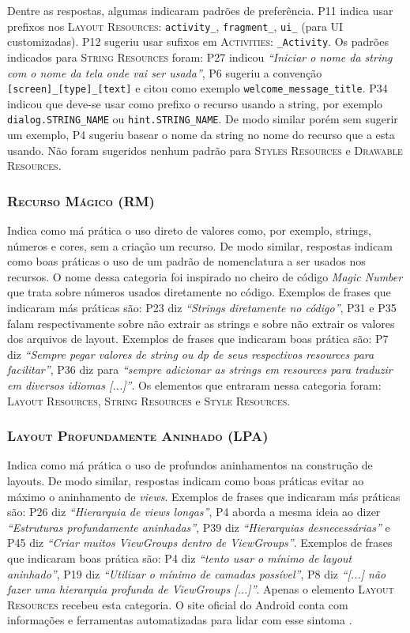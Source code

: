 Dentre as respostas, algumas indicaram padrões de preferência. P11 indica usar prefixos nos \textsc{Layout Resources}: \texttt{activity\_}, \texttt{fragment\_}, \texttt{ui\_} (para UI customizadas). P12 sugeriu usar sufixos em \textsc{Activities}: \texttt{\_Activity}. Os padrões indicados para \textsc{String Resources} foram: P27 indicou \textit{``Iniciar o nome da string com o nome da tela onde vai ser usada''}, P6 sugeriu a convenção \texttt{[screen]\_[type]\_[text]} e citou como exemplo \texttt{welcome\_message\_title}. P34 indicou que deve-se usar como prefixo o recurso usando a string, por exemplo \texttt{dialog.STRING\_NAME} ou \texttt{hint.STRING\_NAME}. De modo similar porém sem sugerir um exemplo, P4 sugeriu basear o nome da string no nome do recurso que a esta usando. Não foram sugeridos nenhum padrão para \textsc{Styles Resources} e \textsc{Drawable Resources}.

\subsubsection{\textsc{Recurso Mágico (RM)}}
Indica como má prática o uso direto de valores como, por exemplo, strings, números e cores, sem a criação um recurso. De modo similar, respostas indicam como boas práticas o uso de um padrão de nomenclatura a ser usados nos recursos. O nome dessa categoria foi inspirado no cheiro de código \textit{Magic Number} \cite{Martin:2008:CCH:1388398} que trata sobre números usados diretamente no código. Exemplos de frases que indicaram más práticas são: P23 diz \textit{``Strings diretamente no código''}, P31 e P35 falam respectivamente sobre não extrair as strings e sobre não extrair os valores dos arquivos de layout. Exemplos de frases que indicaram boas prática são: P7 diz \textit{``Sempre pegar valores de string ou dp de seus respectivos resources para facilitar''}, P36 diz para \textit{``sempre adicionar as strings em resources para traduzir em diversos idiomas [...]''}. Os elementos que entraram nessa categoria foram: \textsc{Layout Resources}, \textsc{String Resources} e \textsc{Style Resources}. 


\subsubsection{\textsc{Layout Profundamente Aninhado (LPA)}} 
Indica como má prática o uso de profundos aninhamentos na construção de layouts. De modo similar, respostas indicam como boas práticas evitar ao máximo o aninhamento de \textit{views}. Exemplos de frases que indicaram más práticas são: P26 diz \textit{``Hierarquia de views longas''}, P4 aborda a mesma ideia ao dizer \textit{``Estruturas profundamente aninhadas''}, P39 diz \textit{``Hierarquias desnecessárias''} e P45 diz \textit{``Criar muitos ViewGroups dentro de ViewGroups''}. Exemplos de frases que indicaram boas prática são: P4 diz \textit{``tento usar o mínimo de layout aninhado''}, P19 diz \textit{``Utilizar o mínimo de camadas possível''}, P8 diz \textit{``[...] não fazer uma hierarquia profunda de ViewGroups [...]''}. Apenas o elemento \textsc{Layout Resources} recebeu esta categoria. O site oficial do Android conta com informações e ferramentas automatizadas para lidar com esse sintoma \cite{OptmizingViewHierarchies}. 



